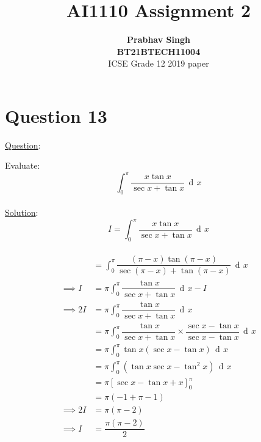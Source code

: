 \documentclass[journal,12pt,twocolumn]{IEEEtran}
\DeclareMathOperator{\di}{d\!}
\begin{document}
	\title{\textbf{AI1110 Assignment 2} }
	\author{\textbf{Prabhav Singh}\\\textbf{BT21BTECH11004}\\ ICSE Grade 12 2019 paper}
	\maketitle
	
	{\section*{Question 13}}
	
	{\large \underline{Question}:\newline}
	
	Evaluate:
	\begin{equation}
		\int_{0}^{{\pi}} \dfrac{x \tan x}{\sec x + \tan x } \,\di x 
	\end{equation}\\
	
	{\large \underline{Solution}:}\\
	 	\begin{equation}
	 I=	\int_{0}^{{\pi}} \dfrac{x \tan x}{\sec x + \tan x } \,\di x 
	 \end{equation}\\
	\begin{align}
	&=	\int_{0}^{{\pi}} \dfrac{({\pi-x})\tan({\pi-x})}{\sec({\pi-x})  + \tan ({\pi-x}) } \,\di x   \\
	\implies I 	&= {\pi}\int_{0}^{{\pi}} \dfrac{\tan x}{\sec x  + \tan x } \,\di x  -I \\
	\implies 2I	&=  {\pi}\int_{0}^{{\pi}} \dfrac{\tan x}{\sec x  + \tan x } \,\di x \\
	        	&=  {\pi}\int_{0}^{{\pi}} \dfrac{\tan x}{\sec x  + \tan x } \times\dfrac{\sec x -\tan x}{\sec x -\tan x}\,\di x  \\
	        	&= {\pi}\int_{0}^{{\pi}} \tan x(\sec x-\tan x)\,\di x\\
	        	&=  {\pi}\int_{0}^{{\pi}}( \tan x\sec x-\tan^2 x)\,\di x\\
	        	&={\pi} \left[\sec x -\tan x +x \right]^{\pi}_{0}\\
	        	&= {\pi}(-1+{\pi}-1)\\
	\implies 2I &={\pi}({\pi}-2) \\
	\implies I  &= \dfrac{{\pi}({\pi}-2)}{2}      	
		\end{align}
	
\end{document}
